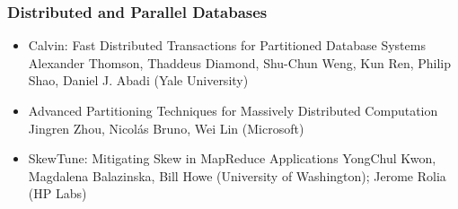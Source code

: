 % 
% 
% 
% 
% 
% 
% 
% 	
% 


\begin{frame} %
\frametitle{Distributed and Parallel Databases}
\begin{itemize}
\item Calvin: Fast Distributed Transactions for Partitioned Database Systems	
\ritem Alexander Thomson,  Thaddeus Diamond,  Shu-Chun Weng,  Kun Ren,  Philip Shao,  Daniel J. Abadi (Yale University)

\item Advanced Partitioning Techniques for Massively Distributed Computation	
\ritem Jingren Zhou,  Nicolás Bruno,  Wei Lin (Microsoft)

\item SkewTune: Mitigating Skew in MapReduce Applications	
\ritem YongChul Kwon, Magdalena Balazinska, Bill Howe (University of Washington); Jerome Rolia (HP Labs)
\end{itemize}

\end{frame}

